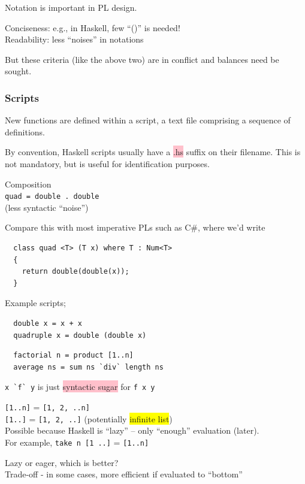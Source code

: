\documentclass[tikz,border=10pt]{project_plan}
\begin{document}
Notation is important in PL design.

Conciseness: e.g., in Haskell, few “()” is needed!\\
Readability: less “noises” in notations

But these criteria (like the above two) are in conflict
and balances need be sought.

\subsubsection{Scripts}

New functions are defined within a script, a text file
comprising a sequence of definitions.

By convention, Haskell scripts usually have a \colorbox{pink}{.hs}
suffix on their filename. This is not mandatory, but is
useful for identification purposes.

Composition\\
\lstinline|quad = double . double|\\
(less syntactic “noise”)

Compare this with most imperative PLs such as C\#, where we’d write\\
\begin{lstlisting}
  class quad <T> (T x) where T : Num<T>
  {
    return double(double(x));
  }
\end{lstlisting}

Example scripts;
\begin{lstlisting}
  double x = x + x
  quadruple x = double (double x)
\end{lstlisting}

\begin{lstlisting}
  factorial n = product [1..n]
  average ns = sum ns `div` length ns
\end{lstlisting}
\lstinline|x `f` y| is just \colorbox{pink}{syntactic sugar} for \lstinline|f x y|

\lstinline{[1..n]} = \lstinline{[1, 2, ..n]}\\
\lstinline{[1..]} = \lstinline{[1, 2, ..]} (potentially \colorbox{yellow}{infinite list})\\
Possible because Haskell is “lazy” -- only “enough” evaluation (later).\\
For example, \lstinline{take n [1 ..]} = \lstinline{[1..n]}

Lazy or eager, which is better?\\
Trade-off - in
some cases, more efficient if evaluated to “bottom”
\end{document}
